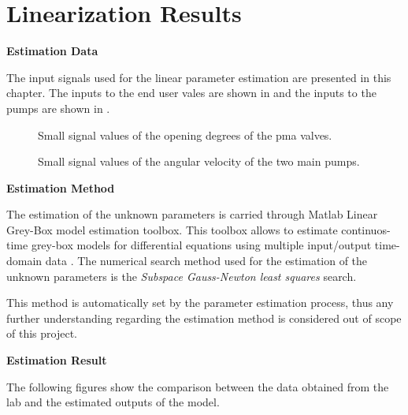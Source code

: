 \chapter{Linearization Results}
\label{LinResults}
\textbf{Estimation Data}

The input signals used for the linear parameter estimation are presented in this chapter.  
The inputs to the end user vales are shown in  and the inputs to the pumps are shown in . 

\begin{figure}[H]
\centering
 
\caption{Small signal values of the opening degrees of the pma valves. }
\label{fig:est_OD_data}
\end{figure}

\begin{figure}[H]
\centering
 
\caption{Small signal values of the angular velocity of the two main pumps.}
\label{fig:est_deltap_data}
\end{figure}

\textbf{Estimation Method}

The estimation of the unknown parameters is carried through Matlab Linear Grey-Box model estimation toolbox. This toolbox allows to estimate continuos-time 
grey-box models for differential equations using multiple input/output time-domain data \cite{LinearEstimation}.
The numerical search method used for the estimation of the unknown parameters is the \textit{Subspace Gauss-Newton least squares} search. 

This method is automatically set by the parameter estimation process, thus any further understanding regarding the estimation method is considered out of 
scope of this project. 


\textbf{Estimation Result}

 

The following figures show the comparison between the data obtained from the lab and the estimated outputs of the model.  


